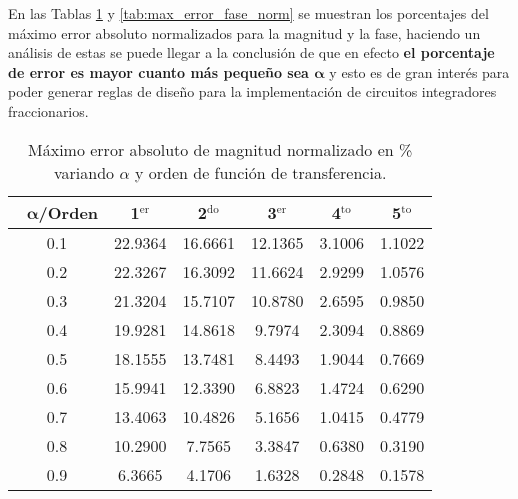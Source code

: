 	En las Tablas \ref{tab:max_error_mag_norm} y \ref{tab:max_error_fase_norm} se muestran los porcentajes del máximo error absoluto normalizados para la magnitud y la fase, haciendo un análisis de estas se puede llegar a la conclusión de que en efecto \textbf{el porcentaje de error es mayor cuanto más pequeño sea $\bm{\alpha}$} y esto es de gran interés para poder generar reglas de diseño para la implementación de circuitos integradores fraccionarios.

\begin{table}[!hbp]                                 
\centering            
\caption{Máximo error absoluto de magnitud normalizado en \% variando $\alpha$ y orden de función de transferencia.}                           
\label{tab:max_error_mag_norm}                               
\begin{tabular}{cccccc}
\hline                                             
$\,\,\,\,\bm{\alpha}$\textbf{/Orden} & \textbf{1$^{\mathrm{er}}$} & \textbf{2$^{\mathrm{do}}$} & \textbf{3$^{\mathrm{er}}$} & \textbf{4$^{\mathrm{to}}$} & \textbf{5$^{\mathrm{to}}$} \\                     
\hline                                             
0.1 & 22.9364 & 16.6661 & 12.1365 & 3.1006 & 1.1022 \\
                                               
0.2 & 22.3267 & 16.3092 & 11.6624 & 2.9299 & 1.0576 \\
                                                
0.3 & 21.3204 & 15.7107 & 10.8780 & 2.6595 & 0.9850 \\
                                               
0.4 & 19.9281 & 14.8618 & 9.7974 & 2.3094 & 0.8869 \\ 
                                               
0.5 & 18.1555 & 13.7481 & 8.4493 & 1.9044 & 0.7669 \\ 
                                                
0.6 & 15.9941 & 12.3390 & 6.8823 & 1.4724 & 0.6290 \\ 
                                              
0.7 & 13.4063 & 10.4826 & 5.1656 & 1.0415 & 0.4779 \\ 
                                              
0.8 & 10.2900 & 7.7565 & 3.3847 & 0.6380 & 0.3190 \\  
                                             
0.9 & 6.3665 & 4.1706 & 1.6328 & 0.2848 & 0.1578 \\  
\hline                                             
\end{tabular}                                                             
\end{table}


